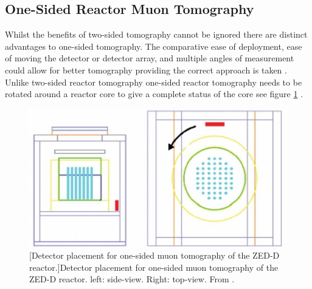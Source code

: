 \subsection{One-Sided Reactor Muon Tomography}
Whilst the benefits of two-sided tomography cannot be ignored there are distinct advantages to one-sided tomography. The comparative ease of deployment, ease of moving the detector or detector array, and multiple angles of measurement could allow for better tomography providing the correct approach is taken \cite{Erlandson_reactorOST_2018}. Unlike two-sided reactor tomography one-sided reactor tomography needs to be rotated around a reactor core to give a complete status of the core see figure \ref{fig:Zed2Core1dRotation} \cite{Erlandson_reactorOST_2018}. 


\begin{figure}[!h]
 \centering
 \includegraphics[width=0.7\linewidth]{Chapter5/Figs/MuTomographyExamples/Zed2Core1dRotation.jpg}
 [Detector placement for one-sided muon tomography of the ZED-D reactor.]{Detector placement for one-sided muon tomography of the ZED-D reactor. left: side-view. Right: top-view. From \cite{Erlandson_reactorOST_2018}.} 
 \label{fig:Zed2Core1dRotation}
\end{figure}

